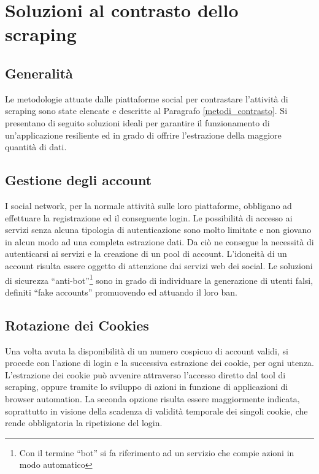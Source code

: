 \section{Soluzioni al contrasto dello scraping}\label{contrasto_scraping}
\subsection{Generalit\`a}
Le metodologie attuate dalle piattaforme social per contrastare l'attivit\`a di scraping sono state elencate e descritte al Paragrafo \ref{metodi_contrasto}. Si presentano di seguito soluzioni ideali per garantire il funzionamento di un'applicazione resiliente ed in grado di offrire l'estrazione della maggiore quantit\`a di dati.


\subsection{Gestione degli account} \label{account}
I social network, per la normale attivit\`a sulle loro piattaforme, obbligano ad effettuare la registrazione ed il conseguente login. Le possibilit\`a di accesso ai servizi senza alcuna tipologia di autenticazione sono molto limitate e non giovano in alcun modo ad una completa estrazione dati. Da ci\`o ne consegue la necessit\`a di autenticarsi ai servizi e la creazione di un pool di account. 
L'idoneit\`a di un account risulta essere oggetto di attenzione dai servizi web dei social. Le soluzioni di sicurezza ``anti-bot''\footnote{Con il termine ``bot'' si fa riferimento ad un servizio che compie azioni in modo automatico} sono in grado di individuare la generazione di utenti falsi, definiti ``fake accounts'' promuovendo ed attuando il loro ban.
\subsection{Rotazione dei Cookies}\label{cookie rotation}
Una volta avuta la disponibilit\`a di un numero cospicuo di account validi, si procede con l'azione di login e la successiva estrazione dei cookie, per ogni utenza.
L'estrazione dei cookie pu\`o avvenire attraverso l'accesso diretto dal tool di scraping, oppure tramite lo sviluppo di azioni in funzione di applicazioni di browser automation. 
La seconda opzione risulta essere maggiormente indicata, soprattutto in visione della scadenza di validit\`a temporale dei singoli cookie, che rende obbligatoria la ripetizione del login. 

